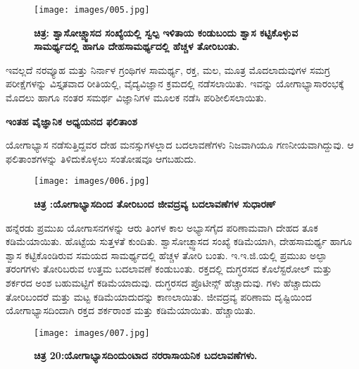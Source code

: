 \begin{figure}
\texttt{[image: images/005.jpg]}
\caption{\textbf{ಚಿತ್ರ:  ಶ್ವಾಸೋಚ್ಚ್ವಾಸದ ಸಂಖ್ಯೆಯಲ್ಲಿ ಸ್ವಲ್ಪ ಇಳಿತಾಯ ಕಂಡುಬಂದು ಶ್ವಾಸ ಕಟ್ಟಿಕೊಳ್ಳುವ ಸಾಮರ್ಥ್ಯದಲ್ಲಿ ಹಾಗೂ ದೇಹಸಾಮರ್ಥ್ಯದಲ್ಲಿ ಹೆಚ್ಚಳ ತೋರಿಬಂತು.} }
\end{figure}

ಇವಲ್ಲದೆ ನರವ್ಯೂಹ ಮತ್ತು ನಿರ್ನಾಳ ಗ್ರಂಥಿಗಳ ಸಾಮರ್ಥ್ಯ, ರಕ್ತ, ಮಲ, ಮೂತ್ರ ಮೊದಲಾದುವುಗಳ ಸಮಗ್ರ ಪರೀಕ್ಷೆಗಳನ್ನು ವಿಸ್ತೃತವಾದ ರೀತಿಯಲ್ಲಿ, ವೈದ್ಯವಿಜ್ಞಾನ ಕ್ರಮದಲ್ಲಿ ನಡೆಸಲಾಯಿತು. ಇವನ್ನು ಯೋಗಾಭ್ಯಾಸಾರಂಭಕ್ಕೆ ಮೊದಲು ಹಾಗೂ ನಂತರ ಸಮರ್ಥ ವಿಜ್ಞಾನಿಗಳ ಮೂಲಕ ನಡೆಸಿ ಪರಿಶೀಲಿಸಲಾಯಿತು.

\textbf{ಇಂತಹ ವೈಜ್ಞಾನಿಕ ಅಧ್ಯಯನದ ಫಲಿತಾಂಶ}

ಯೋಗಾಭ್ಯಾಸ ನಡೆಸುತ್ತಿದ್ದವರ ದೇಹ ಮನಸ್ಸುಗಳಲ್ಲಾದ ಬದಲಾವಣೆಗಳು ನಿಜವಾಗಿಯೂ ಗಣನೀಯವಾಗಿದ್ದುವು. ಆ ಫಲಿತಾಂಶಗಳನ್ನು ತಿಳಿದುಕೊಳ್ಳಲು ಸಂತೋಷವೂ ಆಗಬಹುದು.

\begin{figure}
\texttt{[image: images/006.jpg]}
\caption{\textbf{ಚಿತ್ರ :ಯೋಗಾಭ್ಯಾಸದಿಂದ ತೋರಿಬಂದ ಜೀವದ್ರವ್ಯ ಬದಲಾವಣೆಗಳ ಸುಧಾರಣ್} }
\end{figure}

ಹನ್ನೆರಡು ಪ್ರಮುಖ ಯೋಗಾಸನಗಳನ್ನು ಆರು ತಿಂಗಳ ಕಾಲ ಅಭ್ಯಾಸಗೈದ ಪರಿಣಾಮವಾಗಿ ದೇಹದ ತೂಕ ಕಡಿಮೆಯಾಯಿತು. ಹೊಟ್ಟೆಯ ಸುತ್ತಳತೆ ಕುಂದಿತು. ಶ್ವಾಸೋಚ್ಛ್ವಾಸದ ಸಂಖ್ಯೆ ಕಡಿಮೆಯಾಗಿ, ದೇಹಸಾಮರ್ಥ್ಯ ಹಾಗೂ ಶ್ವಾಸ ಕಟ್ಟಿಕೊಂಡಿರುವ ಸಮಯದ ಸಾಮರ್ಥ್ಯದಲ್ಲಿ ಹೆಚ್ಚಳ ತೋರಿ ಬಂತು. ಇ.ಇ.ಜಿ.ಯಲ್ಲಿ ಪ್ರಮುಖ ಅಲ್ಫಾ ತರಂಗಗಳು ತೋರಿಬರುವ ಉತ್ತಮ ಬದಲಾವಣೆ ಕಂಡುಬಂತು. ರಕ್ತದಲ್ಲಿ ದುಗ್ಧರಸದ ಕೊಲೆಸ್ಟರೋಲ್  ಮತ್ತು ಶರ್ಕರದ ಅಂಶ ಬಹುಮಟ್ಟಿಗೆ ಕಡಿಮೆಯಾದುವು. ದುಗ್ಧರಸದ ಪ್ರೊಟೀನ್ಸ್  ಹೆಚ್ಚಾದುವು.  ಗಳು ಹೆಚ್ಚಾದುದು ತೋರಿಬಂದರೆ  ಮತ್ತು  ಮಟ್ಟ  ಕಡಿಮೆಯಾದುದನ್ನು ಕಾಣಲಾಯಿತು. ಜೀವದ್ರವ್ಯ ಪರಿಣಾಮ ದೃಷ್ಟಿಯಿಂದ ಯೋಗಾಭ್ಯಾಸದಿಂದಾಗಿ ರಕ್ತದ ಶರ್ಕರಾಂಶ ಮತ್ತು  ಕಡಿಮೆಯಾಯಿತು.  ಹೆಚ್ಚಾಯಿತು.

\begin{center}
\end{center}


\begin{figure}
\texttt{[image: images/007.jpg]}
\caption{\textbf{ಚಿತ್ರ 20:ಯೋಗಾಭ್ಯಾಸದಿಂದುಂಟಾದ ನರರಾಸಾಯನಿಕ ಬದಲಾವಣೆಗಳು.} }
\end{figure}

\begin{center}
\end{center}


